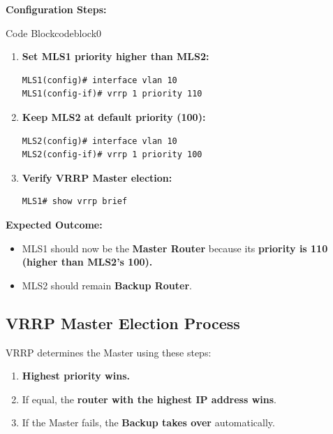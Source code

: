 \documentclass[a4paper]{book}
\begin{document}
\textbf{Configuration Steps:}


\vspace{1.5em}


\begin{ocg}{Code Block}{codeblock}{0}

\vspace{0.5cm}
\begin{enumerate}
\item \textbf{Set MLS1 priority higher than MLS2:}
\begin{lstlisting}
MLS1(config)# interface vlan 10
MLS1(config-if)# vrrp 1 priority 110
\end{lstlisting}

\item \textbf{Keep MLS2 at default priority (100):}
\begin{lstlisting}
MLS2(config)# interface vlan 10
MLS2(config-if)# vrrp 1 priority 100
\end{lstlisting}

\item \textbf{Verify VRRP Master election:}
\begin{lstlisting}
MLS1# show vrrp brief
\end{lstlisting}
\end{enumerate}
\end{ocg}




\textbf{Expected Outcome:}
\begin{itemize}
\item MLS1 should now be the \textbf{Master Router} because its \textbf{priority is 110 (higher 
than MLS2’s 100).}
\item MLS2 should remain \textbf{Backup Router}.
\end{itemize}

\subsection{VRRP Master Election Process}
VRRP determines the Master using these steps:
\begin{enumerate}
\item \textbf{Highest priority wins.}
\item If equal, the \textbf{router with the highest IP address wins}.
\item If the Master fails, the \textbf{Backup takes over} automatically.
\end{enumerate}
\end{document}
